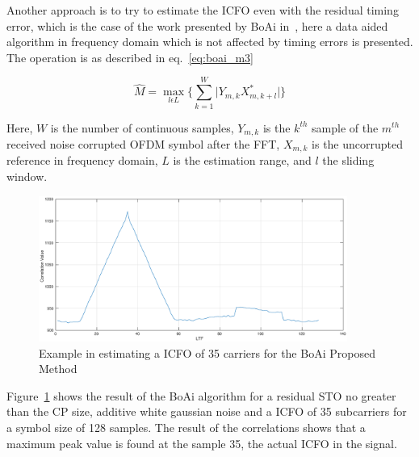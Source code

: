 Another approach is to try to estimate the ICFO even with the residual timing error, which is the case of the work presented by BoAi in~\cite{boai_icfo}, here a data aided algorithm in frequency domain which is not affected by timing errors is presented. The operation is as described in  eq.~\ref{eq:boai_m3} 

\begin{equation} 
\hat{M} = \max\limits_{l \epsilon L}\{{\sum\limits_{k=1}^{W} | Y_{m, k}X^{*}_{m, k + l}} | \}
\label{eq:boai_m3}
\end{equation}

Here, $W$ is the number of continuous samples, $Y_{m, k}$ is the $k^{th}$ sample of the $m^{th}$ received noise corrupted OFDM symbol after the FFT, $X_{m, k}$ is the uncorrupted reference in frequency domain, $L$ is the estimation range, and $l$ the sliding window. 

\begin{figure}[hbt]
  \centering
    \includegraphics[width=0.9\textwidth]
      {./figures/correclation_result_sz128_err35_sto_boai}
  \caption{Example in estimating a ICFO of 35 carriers for the BoAi Proposed Method}
  \label{fig:xcorr_boai_exm}
\end{figure}

Figure~\ref{fig:xcorr_boai_exm} shows the result of the BoAi algorithm for a residual STO no greater than the CP size, additive white gaussian noise and a ICFO of 35 subcarriers for a symbol size of 128 samples. The result of the correlations shows that a maximum peak value is found at the sample 35, the actual ICFO in the signal. 




